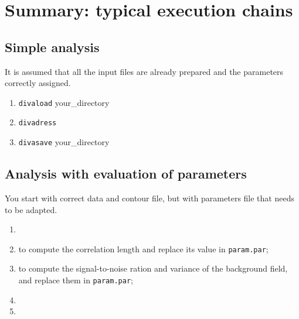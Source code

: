 


\section{Summary: typical execution chains}


\subsection{Simple analysis}

It is assumed that all the input files are already prepared and the parameters correctly assigned.

\begin{enumerate}
\item \texttt{divaload} your\_directory
\item \texttt{divadress}
\item \texttt{divasave} your\_directory
\end{enumerate}



\subsection{Analysis with evaluation of parameters}

You start with correct data and contour file, but with parameters file that needs to be adapted.

\begin{enumerate}
\item {}
\item {} \qquad to compute the correlation length and replace its value in \texttt{param.par};
\item {} \qquad to compute the signal-to-noise ration and variance of the background field, and replace them in \texttt{param.par};
\item {}
\item {}
\end{enumerate}



